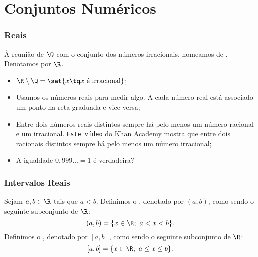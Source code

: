 \section{Conjuntos Numéricos}
\begin{frame}
    \frametitle{Reais} 
    \begin{definicao}
    À reunião de $\Q$ com o conjunto dos números irracionais, nomeamos
    de . Denotamos por $\R$.
    \end{definicao}\pause
    
    \begin{itemize}
    \item $\R \setminus \Q = \set {x \tq x \text{ é irracional}}$;
    \item Usamos os números reais para medir algo. A cada número real
    está associado um ponto na reta graduada e vice-versa;
    \item Entre dois números reais distintos sempre há pelo menos um número racional e um
    irracional.
    \href{https://pt.khanacademy.org/math/algebra/rational-and-irrational-numbers/proofs-concerning-irrational-numbers/v/proof-that-there-is-an-irrational-number-between-any-two-rational-numbers}
    {{\tt Este vídeo}} do Khan Academy mostra que entre dois racionais
    distintos sempre há pelo menos um número irracional;
    \item A igualdade $0,999\dots = 1 $ é verdadeira?
    \end{itemize}
    \end{frame}
    
    
    
    \begin{frame}
        \frametitle{Intervalos Reais} 
        \begin{definicao}
            Sejam $a, b \in \R$ tais que $a < b$. Definimos o , denotado por $(a, b)$, como sendo o seguinte subconjunto de $\R$:
            $$ (a,b) = \{ x \in \R ; \  a < x < b \}.$$
            Definimos o , denotado por $[a, b]$, como sendo o seguinte subconjunto de $\R$:
            $$ [a,b] = \{ x \in \R ; \  a \leq x \leq b \}.$$


        \end{definicao}
        \end{frame}


